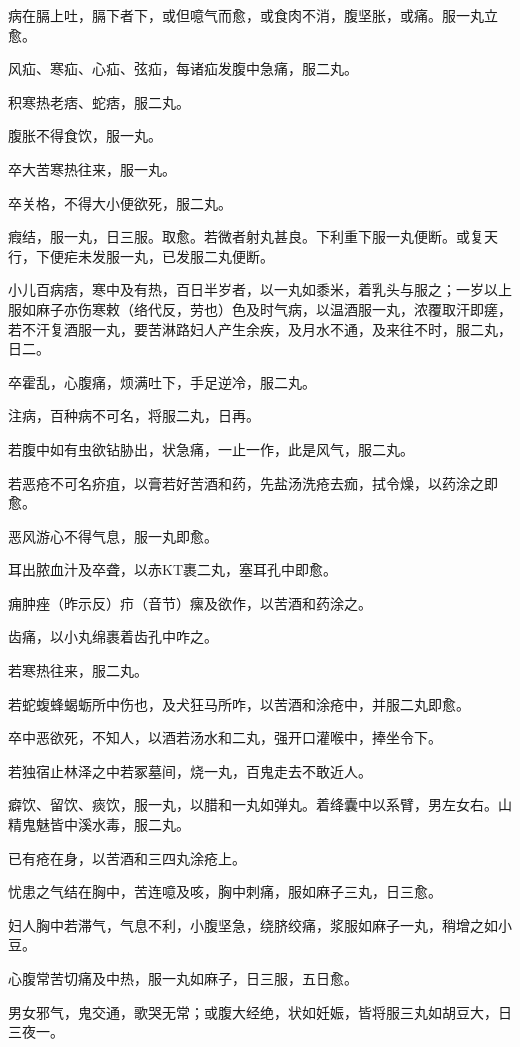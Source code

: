 \documentclass[a4paper,12pt,UTF8,twoside]{ctexbook}
\begin{document}
病在膈上吐，膈下者下，或但噫气而愈，或食肉不消，腹坚胀，或痛。服一丸立愈。

风疝、寒疝、心疝、弦疝，每诸疝发腹中急痛，服二丸。

积寒热老痞、蛇痞，服二丸。

腹胀不得食饮，服一丸。

卒大苦寒热往来，服一丸。

卒关格，不得大小便欲死，服二丸。

瘕结，服一丸，日三服。取愈。若微者射丸甚良。下利重下服一丸便断。或复天行，下便疟未发服一丸，已发服二丸便断。

小儿百病痞，寒中及有热，百日半岁者，以一丸如黍米，着乳头与服之；一岁以上服如麻子亦伤寒敕（络代反，劳也）色及时气病，以温酒服一丸，浓覆取汗即瘥，若不汗复酒服一丸，要苦淋路妇人产生余疾，及月水不通，及来往不时，服二丸，日二。

卒霍乱，心腹痛，烦满吐下，手足逆冷，服二丸。

注病，百种病不可名，将服二丸，日再。

若腹中如有虫欲钻胁出，状急痛，一止一作，此是风气，服二丸。

若恶疮不可名疥疽，以膏若好苦酒和药，先盐汤洗疮去痂，拭令燥，以药涂之即愈。

恶风游心不得气息，服一丸即愈。

耳出脓血汁及卒聋，以赤KT裹二丸，塞耳孔中即愈。

痈肿痤（昨示反）疖（音节）瘰及欲作，以苦酒和药涂之。

齿痛，以小丸绵裹着齿孔中咋之。

若寒热往来，服二丸。

若蛇蝮蜂蝎蛎所中伤也，及犬狂马所咋，以苦酒和涂疮中，并服二丸即愈。

卒中恶欲死，不知人，以酒若汤水和二丸，强开口灌喉中，捧坐令下。

若独宿止林泽之中若冢墓间，烧一丸，百鬼走去不敢近人。

癖饮、留饮、痰饮，服一丸，以腊和一丸如弹丸。着绛囊中以系臂，男左女右。山精鬼魅皆中溪水毒，服二丸。

已有疮在身，以苦酒和三四丸涂疮上。

忧患之气结在胸中，苦连噫及咳，胸中刺痛，服如麻子三丸，日三愈。

妇人胸中若滞气，气息不利，小腹坚急，绕脐绞痛，浆服如麻子一丸，稍增之如小豆。

心腹常苦切痛及中热，服一丸如麻子，日三服，五日愈。

男女邪气，鬼交通，歌哭无常；或腹大经绝，状如妊娠，皆将服三丸如胡豆大，日三夜一。
\end{document}
